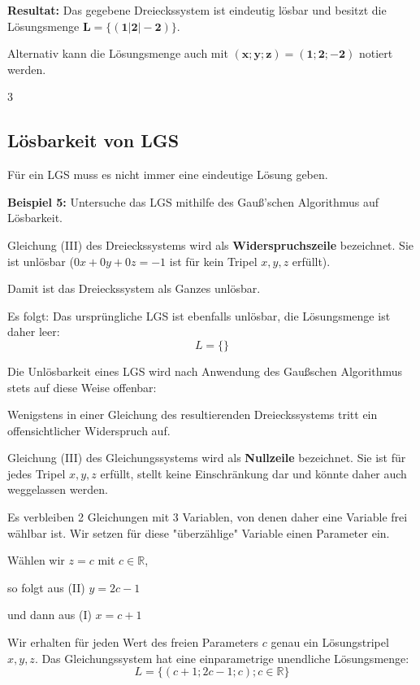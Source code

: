 \documentclass{article}
\begin{document}
\textbf{Resultat:} Das gegebene Dreieckssystem ist eindeutig lösbar und besitzt die Lösungsmenge $\mathbf{L = \{(1|2|-2)\}}$.

Alternativ kann die Lösungsmenge auch mit $\mathbf{(x; y; z) = (1; 2; -2)}$ notiert werden.

\hfill 3

\newpage

\subsection{Lösbarkeit von LGS}

Für ein LGS muss es nicht immer eine eindeutige Lösung geben.

\textbf{Beispiel 5:} Untersuche das LGS mithilfe des Gauß'schen Algorithmus auf Lösbarkeit.

\begin{minipage}[t]{0.48\textwidth}
Gleichung (III) des Dreieckssystems wird als \textbf{Widerspruchszeile} bezeichnet. Sie ist unlösbar ($0x + 0y + 0z = -1$ ist für kein Tripel $x, y, z$ erfüllt).

Damit ist das Dreieckssystem als Ganzes unlösbar.

Es folgt: Das ursprüngliche LGS ist ebenfalls unlösbar, die Lösungsmenge ist daher leer:
$$L = \{\}$$

Die Unlösbarkeit eines LGS wird nach Anwendung des Gaußschen Algorithmus stets auf diese Weise offenbar:

Wenigstens in einer Gleichung des resultierenden Dreieckssystems tritt ein offensichtlicher Widerspruch auf.
\end{minipage}%
\hfill%
\begin{minipage}[t]{0.48\textwidth}
Gleichung (III) des Gleichungssystems wird als \textbf{Nullzeile} bezeichnet. Sie ist für jedes Tripel $x, y, z$ erfüllt, stellt keine Einschränkung dar und könnte daher auch weggelassen werden.

Es verbleiben 2 Gleichungen mit 3 Variablen, von denen daher eine Variable frei wählbar ist. Wir setzen für diese "überzählige" Variable einen Parameter ein.

Wählen wir $z = c$ \hfill mit $c \in \mathbb{R}$,

so folgt aus (II) $y = 2c - 1$

und dann aus (I) $x = c + 1$

Wir erhalten für jeden Wert des freien Parameters $c$ genau ein Lösungstripel $x, y, z$. Das Gleichungssystem hat eine einparametrige unendliche Lösungsmenge:
$$L = \{(c + 1; 2c - 1; c); c \in \mathbb{R}\}$$
\end{minipage}
\end{document}
